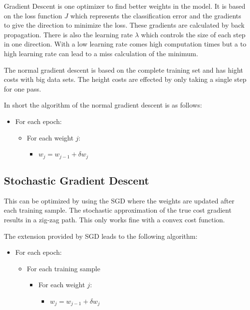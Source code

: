 Gradient Descent is one optimizer to find better weights in the model.
It is based on the loss function $J$ which represents the classification error and the gradients to give the direction to minimize the loss.
These gradients are calculated by back propagation.
There is also the learning rate $\lambda$ which controls the size of each step in one direction.
With a low learning rate comes high computation times but a to high learning rate can lead to a miss calculation of the minimum.

The normal gradient descent is based on the complete training set and has hight costs with big data sets.
The height costs are effected by only taking a single step for one pass.

In short the algorithm of the normal gradient descent is as follows:

\begin{itemize}
	\item For each epoch:
	\begin{itemize}
		\item For each weight $j$:
		\begin{itemize}
            \item $w_j = w_{j-1} + \delta{w_j}$
		\end{itemize}
	\end{itemize}
\end{itemize}

\subsection{Stochastic Gradient Descent}

This can be optimized by using the \ac{SGD} where the weights are updated after each training sample.
The stochastic approximation of the true cost gradient results in a zig-zag path.
This only works fine with a convex cost function.

The extension provided by \ac{SGD} leads to the following algorithm:

\begin{itemize}
	\item For each epoch:
	\begin{itemize}
        \item{For each training sample}
            \begin{itemize}
            \item For each weight $j$:
            \begin{itemize}
                \item $w_j = w_{j-1} + \delta{w_j}$
            \end{itemize}
        \end{itemize}
	\end{itemize}
\end{itemize}


